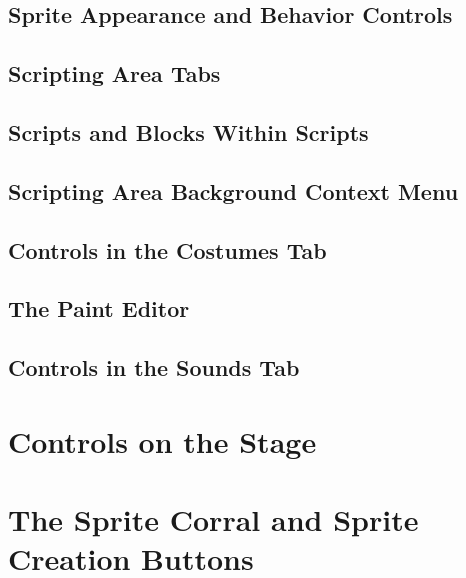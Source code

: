 \documentclass[a4paper]{report}
\begin{document}
\subsection{Sprite Appearance and Behavior Controls}
\subsection{Scripting Area Tabs}
\subsection{Scripts and Blocks Within Scripts}
\subsection{Scripting Area Background Context Menu}
\subsection{Controls in the Costumes Tab}
\subsection{The Paint Editor}
\subsection{Controls in the Sounds Tab}
\section{Controls on the Stage}
\section{The Sprite Corral and Sprite Creation Buttons}
\end{document}
